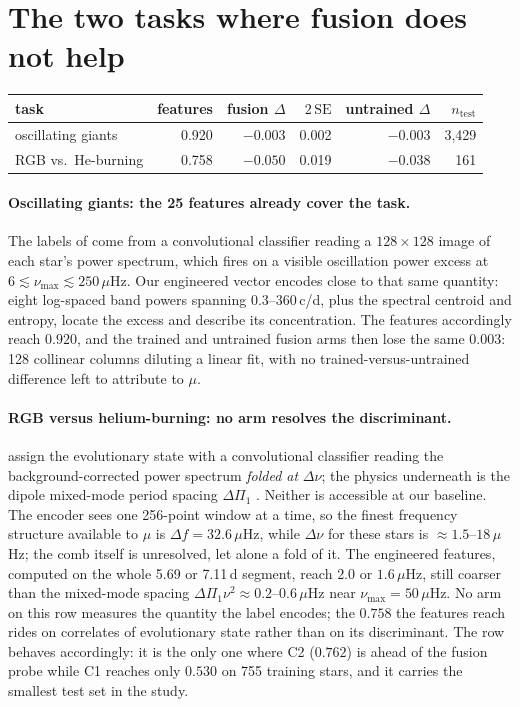 \documentclass{article}
\begin{document}
\section{The two tasks where fusion does not help}
\label{app:negatives}

\begin{center}
\small
\begin{tabular}{lrrrrr}
\toprule
task & features & fusion $\Delta$ & $2\,\mathrm{SE}$ & untrained $\Delta$ & $n_{\mathrm{test}}$ \\
\midrule
oscillating giants & 0.920 & $-0.003$ & 0.002 & $-0.003$ & 3{,}429 \\
RGB vs.\ He-burning & 0.758 & $-0.050$ & 0.019 & $-0.038$ & 161 \\
\bottomrule
\end{tabular}
\end{center}

\paragraph{Oscillating giants: the 25 features already cover the task.} The labels of
\citet{hon2021} come from a convolutional classifier reading a $128 \times 128$ image of each star's
power spectrum, which fires on a visible oscillation power excess at
$6 \lesssim \nu_{\max} \lesssim 250\,\mu$Hz. Our engineered vector encodes close to that same
quantity: eight log-spaced band powers spanning 0.3--360\,c/d, plus the spectral centroid and
entropy, locate the excess and describe its concentration. The features accordingly reach $0.920$,
and the trained and untrained fusion arms then lose the same $0.003$: 128 collinear columns
diluting a linear fit, with no trained-versus-untrained difference left to attribute to $\mu$.

\paragraph{RGB versus helium-burning: no arm resolves the discriminant.} \citet{sreenivas2026} assign
the evolutionary state with a convolutional classifier reading the background-corrected power spectrum
\emph{folded at} $\Delta\nu$; the physics underneath is the dipole mixed-mode period spacing
$\Delta\Pi_{1}$ \citep{bedding2011}. Neither is accessible at our baseline. The encoder sees one
256-point window at a time, so the finest frequency structure available to $\mu$ is
$\Delta f = 32.6\,\mu$Hz, while $\Delta\nu$ for these stars is $\approx 1.5$--$18\,\mu$Hz; the comb
itself is unresolved, let alone a fold of it. The engineered features, computed on the whole 5.69 or 7.11\,d
segment, reach $2.0$ or $1.6\,\mu$Hz, still coarser than the mixed-mode spacing
$\Delta\Pi_{1}\nu^{2} \approx 0.2$--$0.6\,\mu$Hz near $\nu_{\max} = 50\,\mu$Hz. No arm on this row
measures the quantity the label encodes; the $0.758$ the features reach rides on correlates of
evolutionary state rather than on its discriminant. The row behaves accordingly: it is the only one
where C2 ($0.762$) is ahead of the fusion probe while C1 reaches only $0.530$ on 755 training stars,
and it carries the smallest test set in the study.
\end{document}
